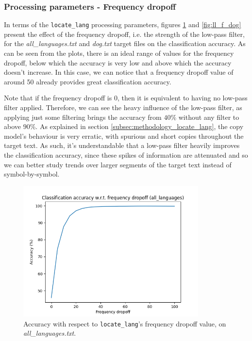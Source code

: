 \documentclass{article}
\begin{document}
\subsubsection{Processing parameters - Frequency dropoff}
\label{subsubsec:results_locate_lang_frequency_dropoff}

In terms of the \texttt{locate\_lang} processing parameters, figures \ref{fig:ll_f_all_languages} and \ref{fig:ll_f_dog} present the effect of the frequency dropoff, i.e. the strength of the low-pass filter, for the \textit{all\_languages.txt} and \textit{dog.txt} target files on the classification accuracy.
As can be seen from the plots, there is an ideal range of values for the frequency dropoff, below which the accuracy is very low and above which the accuracy doesn't increase.
In this case, we can notice that a frequency dropoff value of around 50 already provides great classification accuracy.

Note that if the frequency dropoff is 0, then it is equivalent to having no low-pass filter applied.
Therefore, we can see the heavy influence of the low-pass filter, as applying just some filtering brings the accuracy from $40\%$ without any filter to above $90\%$.
As explained in section \ref{subsec:methodology_locate_lang}, the copy model's behaviour is very erratic, with spurious and short copies throughout the target text.
As such, it's understandable that a low-pass filter heavily improves the classification accuracy, since these spikes of information are attenuated and so we can better study trends over larger segments of the target text instead of symbol-by-symbol.

\begin{figure}
    \centering
    \includegraphics[width=0.85\textwidth]{../results/all_languages/ll-f.png}
    \caption{Accuracy with respect to \texttt{locate\_lang}'s frequency dropoff value, on \textit{all\_languages.txt}.}
    \label{fig:ll_f_all_languages}
\end{figure}
\end{document}
